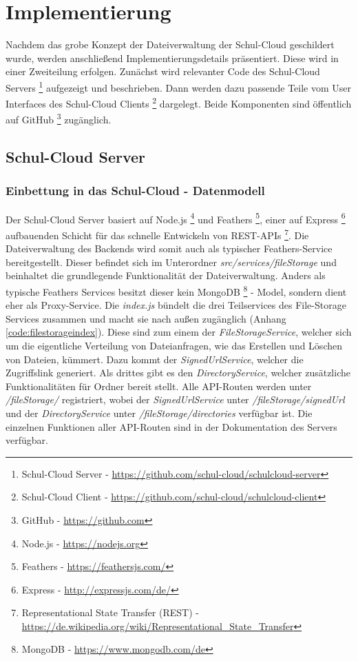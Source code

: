 \section{Implementierung}
\label{sec:implementation}

Nachdem das grobe Konzept der Dateiverwaltung der Schul-Cloud geschildert wurde, werden anschließend Implementierungsdetails präsentiert. Diese wird in einer Zweiteilung erfolgen. Zunächst wird relevanter Code des Schul-Cloud Servers \footnote{Schul-Cloud Server - \url{https://github.com/schul-cloud/schulcloud-server}} aufgezeigt und beschrieben. Dann werden dazu passende Teile vom User Interfaces des Schul-Cloud Clients \footnote{Schul-Cloud Client - \url{https://github.com/schul-cloud/schulcloud-client}} dargelegt. Beide Komponenten sind öffentlich auf GitHub \footnote{GitHub - \url{https://github.com}} zugänglich.

\subsection{Schul-Cloud Server}
\subsubsection{Einbettung in das Schul-Cloud - Datenmodell}

Der Schul-Cloud Server basiert auf Node.js \footnote{Node.js - \url{https://nodejs.org}} und Feathers \footnote{Feathers - \url{https://feathersjs.com/}}, einer auf Express \footnote{Express - \url{http://expressjs.com/de/}} aufbauenden Schicht für das schnelle Entwickeln von REST-APIs \footnote{Representational State Transfer (REST) - \url{https://de.wikipedia.org/wiki/Representational_State_Transfer}}. Die Dateiverwaltung des Backends wird somit auch als typischer Feathers-Service bereitgestellt. Dieser befindet sich im Unterordner \textit{src/services/fileStorage} und beinhaltet die grundlegende Funktionalität der Dateiverwaltung. Anders als typische Feathers Services besitzt dieser kein MongoDB \footnote{MongoDB - \url{https://www.mongodb.com/de}} - Model, sondern dient eher als Proxy-Service. Die \textit{index.js} bündelt die drei Teilservices des File-Storage Services zusammen und macht sie nach außen zugänglich (Anhang \ref{code:filestorageindex}). Diese sind zum einem der \textit{FileStorageService}, welcher sich um die eigentliche Verteilung von Dateianfragen, wie das Erstellen und Löschen von Dateien, kümmert. Dazu kommt der \textit{SignedUrlService}, welcher die Zugriffslink generiert. Als drittes gibt es den \textit{DirectoryService}, welcher zusätzliche Funktionalitäten für Ordner bereit stellt. Alle API-Routen werden unter \textit{/fileStorage/} registriert, wobei der \textit{SignedUrlService} unter \textit{/fileStorage/signedUrl} und der \textit{DirectoryService} unter \textit{/fileStorage/directories} verfügbar ist. Die einzelnen Funktionen aller API-Routen sind in der Dokumentation des Servers \cite{online:serverswagger} verfügbar. \\

